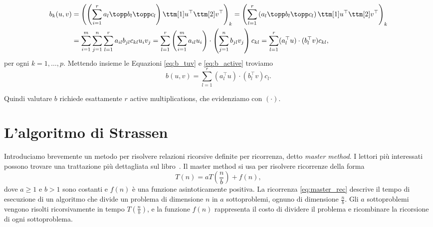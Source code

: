 \begin{equation}
  \label{eq:b_active}
  \begin{aligned}
    b_k(u,v) &= \left( \left( \sum_{i=1}^r a_l \topp b_l \topp c_l \right) \ttm[1] u^{\top} \ttm[2]
  v^{\top}  \right)_k  
             = \left( \sum_{l=1}^r \left( a_l \topp b_l \topp c_l  \right) \ttm[1] u^{\top} \ttm[2]
    v^{\top} \right)_k  \\ 
             &=
  \sum_{i=1}^m \sum_{j=1}^n \sum_{l=1}^r a_{il}b_{jl}c_{kl} u_i v_j = \sum_{l=1}^r \left(\sum_{i=1}^m 
   a_{il} u_i \right) \cdot \left( \sum_{j=1}^n b_{jl} v_j  \right)  c_{kl} = \sum_{l=1}^r
   (a_l^{\top}u) \cdot (b_l^{\top}v)c_{kl},
  \end{aligned}
\end{equation}
per ogni $ k = 1, \ldots, p $.
Mettendo insieme le Equazioni \ref{eq:b_tuv} e \ref{eq:b_active} troviamo
\begin{equation*}
  b(u,v) = \sum_{l=1}^r (a_l^{\top}u)\cdot(b_l^{\top}v)c_l.
\end{equation*}

Quindi valutare $ b $ richiede esattamente $ r $ active multiplications, che evidenziamo con $
(\cdot) $.

\section{L'algoritmo di Strassen}

Introduciamo brevemente un metodo per risolvere relazioni ricorsive definite per ricorrenza, detto
\emph{master method}. I lettori più interessati possono trovare una trattazione più dettagliata sul
libro~\cite{cormen2022introduction}. Il master method si usa per risolvere ricorrenze della forma
\begin{equation}
  \label{eq:master_rec}
  T(n) = aT(\frac{n}{b}) + f(n),
\end{equation}
dove $ a \ge 1 $ e $ b>1 $ sono costanti e $ f(n) $ è una funzione asintoticamente positiva. La
ricorrenza \ref{eq:master_rec} descrive il tempo di esecuzione di un algoritmo che divide un
problema di dimensione $ n $ in $ a $ sottoproblemi, ognuno di dimensione $ \frac{n}{b} $. Gli $ a $
sottoproblemi vengono risolti ricorsivamente in tempo $ T(\frac{n}{b}) $, e la funzione $ f(n) $
rappresenta il costo di dividere il problema e ricombinare la ricorsione di ogni sottoproblema.

